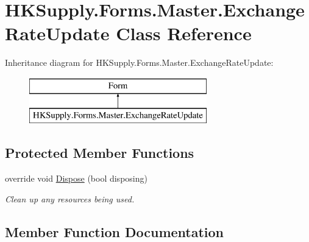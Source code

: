 \hypertarget{class_h_k_supply_1_1_forms_1_1_master_1_1_exchange_rate_update}{}\section{H\+K\+Supply.\+Forms.\+Master.\+Exchange\+Rate\+Update Class Reference}
\label{class_h_k_supply_1_1_forms_1_1_master_1_1_exchange_rate_update}
Inheritance diagram for H\+K\+Supply.\+Forms.\+Master.\+Exchange\+Rate\+Update\+:\begin{figure}[H]
\begin{center}
\leavevmode
\includegraphics[height=2.000000cm]{class_h_k_supply_1_1_forms_1_1_master_1_1_exchange_rate_update}
\end{center}
\end{figure}
\subsection*{Protected Member Functions}
\begin{DoxyCompactItemize}
\item 
override void \mbox{\hyperlink{class_h_k_supply_1_1_forms_1_1_master_1_1_exchange_rate_update_a8a6183a88689de494ee620f85b19dbc5}{Dispose}} (bool disposing)
\begin{DoxyCompactList}\small\item\em Clean up any resources being used. \end{DoxyCompactList}\end{DoxyCompactItemize}


\subsection{Member Function Documentation}
\mbox{\label{class_h_k_supply_1_1_forms_1_1_master_1_1_exchange_rate_update_a8a6183a88689de494ee620f85b19dbc5}} 
